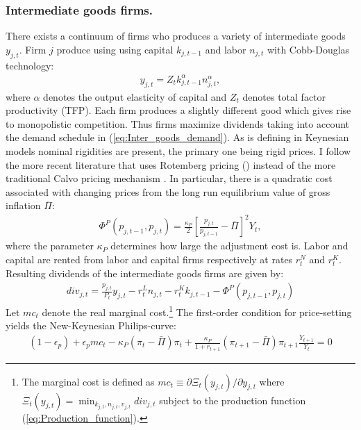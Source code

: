 \subsubsection*{Intermediate goods firms.}
There exists a continuum of firms who produces a variety of intermediate goods $y_{j,t}$. Firm $j$ produce using using capital $k_{j,t-1}$ and labor $n_{j,t}$ with Cobb-Douglas technology:
\begin{gather}
y_{j,t}=Z_{t}k_{j,t-1}^{\alpha}n_{j,t}^{\alpha}, \label{eq:Production_function}
\end{gather}
where $\alpha$ denotes the output elasticity of capital and $Z_t$ denotes total factor productivity (TFP). Each firm produces a slightly different good which gives rise to monopolistic competition. Thus firms maximize dividends taking into account the demand schedule in (\ref{eq:Inter_goods_demand}). As is defining in Keynesian models nominal rigidities are present, the primary one being rigid prices. I follow the more recent literature that uses Rotemberg pricing (\citet{rotemberg1982sticky}) instead of the more traditional Calvo pricing mechanism \citet{calvo1983staggered}. In particular, there is a quadratic cost associated with changing prices from the long run equilibrium value of gross inflation $\overline{\Pi}$:   
\begin{gather*}
\Phi^{P}\left(p_{j,t-1},p_{j,t}\right)=\frac{\kappa_{P}}{2}\left[\frac{p_{j,t}}{p_{j,t-1}}-\overline{\Pi}\right]^{2}Y_{t},
\end{gather*}
where the parameter $\kappa_{P}$ determines how large the adjustment cost is. Labor and capital are rented from labor and capital firms respectively at rates $r^N_t$ and $r^K_t$. Resulting dividends of the intermediate goods firms are given by:
\begin{gather*}
div_{j,t}=\frac{p_{j,t}}{P_{t}}y_{j,t}-r_{t}^{L}n_{j,t}-r_{t}^{K}k_{j,t-1}-\Phi^{P}\left(p_{j,t-1},p_{j,t}\right)
\end{gather*}
Let $mc_{t}$ denote the real marginal cost.\footnote{The marginal cost is defined as $mc_{t}\equiv\partial\Xi_{t}\left(y_{j,t}\right)/\partial y_{j,t}$ where $\Xi_{t}\left(y_{j,t}\right)=\min_{k_{j,t},n_{j,t},v_{j,t}}div_{j,t}$ subject to the production function (\ref{eq:Production_function}).}
The first-order condition for price-setting yields the New-Keynesian Philips-curve:  
\begin{gather}
(1-\epsilon_{p})+\epsilon_{p}mc_{t}-\kappa_{P}\left(\pi_{t}-\bar{\Pi}\right)\pi_{t}+\frac{\kappa_{P}}{1+r_{t+1}}\left(\pi_{t+1}-\bar{\Pi}\right)\pi_{t+1}\frac{Y_{t+1}}{Y_{t}}=0 \label{eq:NK_phillips}
\end{gather}
